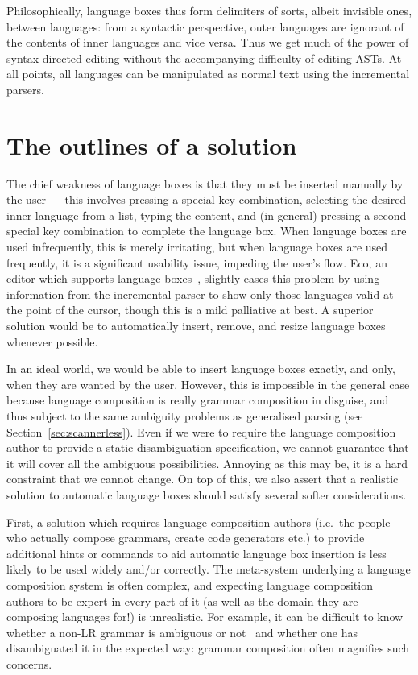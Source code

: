 \documentclass[sigplan,screen]{acmart}\settopmatter{printfolios=true,printccs=false,printacmref=false}
\begin{document}
Philosophically, language boxes thus form delimiters of sorts, albeit invisible
ones, between languages: from a syntactic perspective, outer languages are
ignorant of the contents of inner languages and vice versa. Thus we get much of
the power of syntax-directed editing without the accompanying difficulty of
editing ASTs. At all points, all languages can be manipulated as normal text
using the incremental parsers.


\section{The outlines of a solution}

\label{the problem}
The chief weakness of language boxes is that they must be inserted
manually by the user --- this involves pressing a special key combination,
selecting the desired inner language from a list, typing the content, and (in
general) pressing a second special key combination to complete the language box.
When language boxes are used infrequently, this is merely irritating,
but when language boxes are used frequently, it is a significant usability
issue, impeding the user's flow. Eco, an editor which supports language boxes~\cite{diekmann14eco},
slightly eases this problem by using information from the incremental parser to
show only those languages valid at the point of the cursor,
though this is a mild palliative at best. A superior solution would be
to automatically insert, remove, and resize language boxes whenever possible.

In an ideal world, we would be able to insert language boxes exactly, and only,
when they are wanted by the user. However, this is impossible in the
general case because language composition is really grammar composition
in disguise, and thus subject to the same ambiguity problems as generalised
parsing (see Section~\ref{sec:scannerless}). Even if we were to require the
language composition author to provide a static disambiguation specification,
we cannot guarantee that it will cover all the ambiguous
possibilities. Annoying as this may be, it is a hard constraint that we cannot
change. On top of this, we also assert that a realistic solution to automatic
language boxes should satisfy several softer considerations.

First, a solution which requires language composition authors (i.e.~the people
who actually compose grammars, create code generators etc.) to provide additional
hints or commands to aid automatic language box insertion is less likely
to be used widely and/or correctly. The meta-system underlying a language
composition system is often complex, and expecting language composition authors
to be expert in every part of it (as well as the domain they are composing
languages for!) is unrealistic. For example, it can be difficult to know whether
a non-LR grammar is ambiguous or not~\cite{vasudevan13detecting} and whether
one has disambiguated it in the expected way: grammar
composition often magnifies such concerns.
\end{document}
